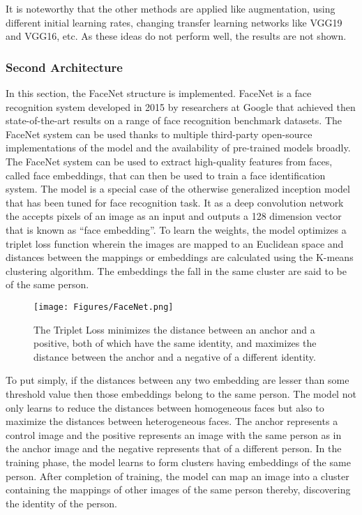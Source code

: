 It is noteworthy that the other methods are applied like augmentation, using different initial learning rates, changing transfer learning networks like VGG19 and VGG16, etc. As these ideas do not perform well, the results are not shown.

\subsubsection*{Second Architecture}
In this section, the FaceNet structure is implemented. FaceNet is a face recognition system developed in 2015 by researchers at Google that achieved then state-of-the-art results on a range of face recognition benchmark datasets. The FaceNet system can be used thanks to multiple third-party open-source implementations of the model and the availability of pre-trained models broadly. The FaceNet system can be used to extract high-quality features from faces, called face embeddings, that can then be used to train a face identification system. The model is a special case of the otherwise generalized inception model that has been tuned for face recognition task. It as a deep convolution network the accepts pixels of an image as an input and outputs a 128 dimension vector that is known as “face embedding”. To learn the weights, the model optimizes a triplet loss function wherein the images are mapped to an Euclidean space and distances between the mappings or embeddings are calculated using the K-means clustering algorithm. The embeddings the fall in the same cluster are said to be of the same person. 

\begin{figure}[H]
	\centering
	\texttt{[image: Figures/FaceNet.png]}
	\caption{The Triplet Loss minimizes the distance between an anchor and a positive, both of which have the same identity, and
		maximizes the distance between the anchor and a negative of a
		different identity.}
	\label{fig:f4}
\end{figure}

To put simply, if the distances between any two embedding are lesser than some threshold value then those embeddings belong to the same person. The model not only learns to reduce the distances between homogeneous faces but also to maximize the distances between heterogeneous faces. The anchor represents a control image and the positive represents an image with the same person as in the anchor image and the negative represents that of a different person. In the training phase, the model learns to form clusters having embeddings of the same person. After completion of training, the model can map an image into a cluster containing the mappings of other images of the same person thereby, discovering the identity of the person.

